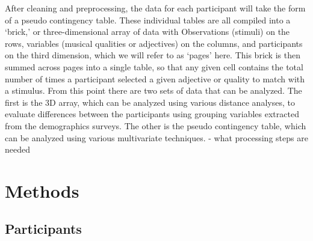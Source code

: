 \documentclass[
  english,
  man,floatsintext]{apa6}
\begin{document}
After cleaning and preprocessing, the data for each participant will take the form of a pseudo contingency table. These individual tables are all compiled into a `brick,' or three-dimensional array of data with Observations (stimuli) on the rows, variables (musical qualities or adjectives) on the columns, and participants on the third dimension, which we will refer to as `pages' here. This brick is then summed across pages into a single table, so that any given cell contains the total number of times a participant selected a given adjective or quality to match with a stimulus.
From this point there are two sets of data that can be analyzed. The first is the 3D array, which can be analyzed using various distance analyses, to evaluate differences between the participants using grouping variables extracted from the demographics surveys. The other is the pseudo contingency table, which can be analyzed using various multivariate techniques.
- what processing steps are needed

\hypertarget{methods}{%
\section{Methods}\label{methods}}

\hypertarget{participants}{%
\subsection{Participants}\label{participants}}
\end{document}
